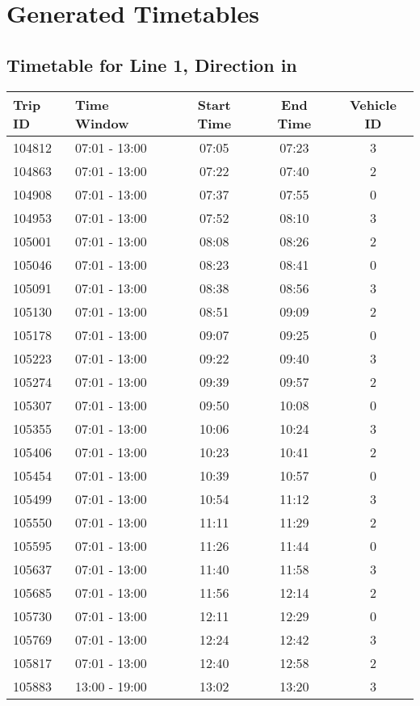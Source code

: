 \documentclass{article}
\begin{document}
            \section*{Generated Timetables}
            \subsection*{Timetable for Line 1, Direction in}
\begin{tabular}{llccc}
\toprule
Trip ID & Time Window & Start Time & End Time & Vehicle ID \\
\midrule
104812 & 07:01 - 13:00 & 07:05 & 07:23 & 3 \\
104863 & 07:01 - 13:00 & 07:22 & 07:40 & 2 \\
104908 & 07:01 - 13:00 & 07:37 & 07:55 & 0 \\
104953 & 07:01 - 13:00 & 07:52 & 08:10 & 3 \\
105001 & 07:01 - 13:00 & 08:08 & 08:26 & 2 \\
105046 & 07:01 - 13:00 & 08:23 & 08:41 & 0 \\
105091 & 07:01 - 13:00 & 08:38 & 08:56 & 3 \\
105130 & 07:01 - 13:00 & 08:51 & 09:09 & 2 \\
105178 & 07:01 - 13:00 & 09:07 & 09:25 & 0 \\
105223 & 07:01 - 13:00 & 09:22 & 09:40 & 3 \\
105274 & 07:01 - 13:00 & 09:39 & 09:57 & 2 \\
105307 & 07:01 - 13:00 & 09:50 & 10:08 & 0 \\
105355 & 07:01 - 13:00 & 10:06 & 10:24 & 3 \\
105406 & 07:01 - 13:00 & 10:23 & 10:41 & 2 \\
105454 & 07:01 - 13:00 & 10:39 & 10:57 & 0 \\
105499 & 07:01 - 13:00 & 10:54 & 11:12 & 3 \\
105550 & 07:01 - 13:00 & 11:11 & 11:29 & 2 \\
105595 & 07:01 - 13:00 & 11:26 & 11:44 & 0 \\
105637 & 07:01 - 13:00 & 11:40 & 11:58 & 3 \\
105685 & 07:01 - 13:00 & 11:56 & 12:14 & 2 \\
105730 & 07:01 - 13:00 & 12:11 & 12:29 & 0 \\
105769 & 07:01 - 13:00 & 12:24 & 12:42 & 3 \\
105817 & 07:01 - 13:00 & 12:40 & 12:58 & 2 \\
105883 & 13:00 - 19:00 & 13:02 & 13:20 & 3 \\

\end{tabular}
\end{document}
